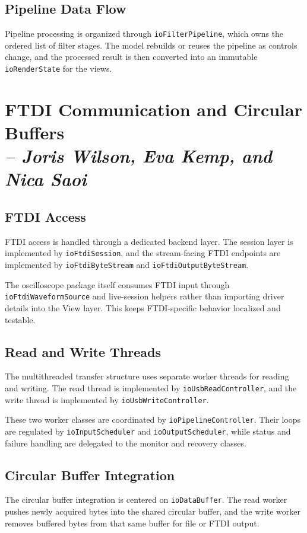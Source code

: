     \subsection{Pipeline Data Flow}
    Pipeline processing is organized through \texttt{ioFilterPipeline}, which owns the ordered list of filter stages. The model rebuilds or reuses the pipeline as controls change, and the processed result is then converted into an immutable \texttt{ioRenderState} for the views.

    \section{FTDI Communication and Circular Buffers \\
    \small{\textit{-- Joris Wilson, Eva Kemp, and Nica Saoi}}}
    \label{Section::FTDI Communication and Circular Buffers}

    \subsection{FTDI Access}
    FTDI access is handled through a dedicated backend layer. The session layer is implemented by \texttt{ioFtdiSession}, and the stream-facing FTDI endpoints are implemented by \texttt{ioFtdiByteStream} and \texttt{ioFtdiOutputByteStream}.

    The oscilloscope package itself consumes FTDI input through \texttt{ioFtdiWaveformSource} and live-session helpers rather than importing driver details into the View layer. This keeps FTDI-specific behavior localized and testable.

    \subsection{Read and Write Threads}
    The multithreaded transfer structure uses separate worker threads for reading and writing. The read thread is implemented by \texttt{ioUsbReadController}, and the write thread is implemented by \texttt{ioUsbWriteController}.

    These two worker classes are coordinated by \texttt{ioPipelineController}. Their loops are regulated by \texttt{ioInputScheduler} and \texttt{ioOutputScheduler}, while status and failure handling are delegated to the monitor and recovery classes.

    \subsection{Circular Buffer Integration}
    The circular buffer integration is centered on \texttt{ioDataBuffer}. The read worker pushes newly acquired bytes into the shared circular buffer, and the write worker removes buffered bytes from that same buffer for file or FTDI output.


